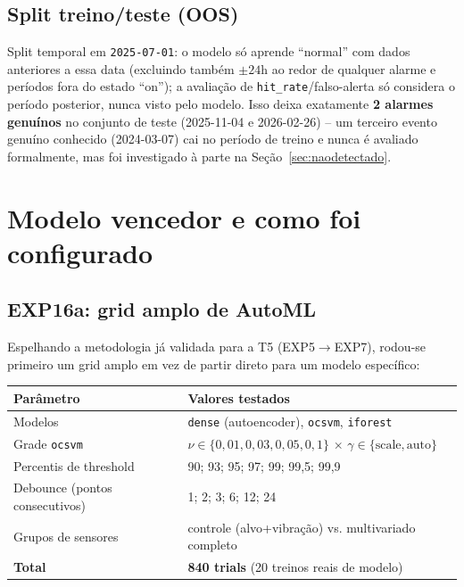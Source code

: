 \documentclass[11pt,a4paper]{article}
\begin{document}
\subsection{Split treino/teste (OOS)}

Split temporal em \texttt{2025-07-01}: o modelo só aprende ``normal'' com
dados anteriores a essa data (excluindo também $\pm 24$h ao redor de
qualquer alarme e períodos fora do estado ``on''); a avaliação de
\texttt{hit\_rate}/falso-alerta só considera o período posterior, nunca
visto pelo modelo. Isso deixa exatamente \textbf{2 alarmes genuínos} no
conjunto de teste (2025-11-04 e 2026-02-26) -- um terceiro evento genuíno
conhecido (2024-03-07) cai no período de treino e nunca é avaliado
formalmente, mas foi investigado à parte na Seção~\ref{sec:naodetectado}.

\section{Modelo vencedor e como foi configurado}
\label{sec:modelo}

\subsection{EXP16a: grid amplo de AutoML}

Espelhando a metodologia já validada para a T5 (EXP5$\to$EXP7), rodou-se
primeiro um grid amplo em vez de partir direto para um modelo específico:

\begin{center}
\begin{tabular}{ll}
\toprule
Parâmetro & Valores testados \\
\midrule
Modelos & \texttt{dense} (autoencoder), \texttt{ocsvm}, \texttt{iforest} \\
Grade \texttt{ocsvm} & $\nu \in \{0{,}01, 0{,}03, 0{,}05, 0{,}1\}$ $\times$ $\gamma \in \{\text{scale}, \text{auto}\}$ \\
Percentis de threshold & 90; 93; 95; 97; 99; 99,5; 99,9 \\
Debounce (pontos consecutivos) & 1; 2; 3; 6; 12; 24 \\
Grupos de sensores & controle (alvo+vibração) vs. multivariado completo \\
\midrule
\textbf{Total} & \textbf{840 trials} (20 treinos reais de modelo) \\
\bottomrule
\end{tabular}
\end{center}
\end{document}
